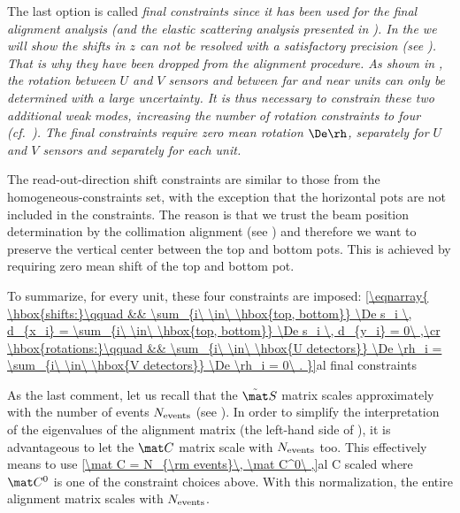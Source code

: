 \> The last option is called \em{final constraints} since it has been used for the final alignment analysis (and the elastic scattering analysis presented in ). In the  we will show the shifts in $z$ can not be resolved with a satisfactory precision (see ). That is why they have been dropped from the alignment procedure. As shown in , the rotation between $U$ and $V$ sensors and between far and near units can only be determined with a large uncertainty. It is thus necessary to constrain these two additional weak modes, increasing the number of rotation constraints to four (cf.~). The final constraints require zero mean rotation $\De\rh$, separately for $U$ and $V$ sensors and separately for each unit.
\par\parindent\itindent\indent\hang
The read-out-direction shift constraints are similar to those from the homogeneous-constraints set, with the exception that the horizontal pots are not included in the constraints. The reason is that we trust the beam position determination by the collimation alignment (see ) and therefore we want to preserve the vertical center between the top and bottom pots. This is achieved by requiring zero mean shift of the top and bottom pot.
\par\parindent\itindent\indent\hang
To summarize, for every unit, these four constraints are imposed:
\eqref{\eqnarray{
\hbox{shifts:}\qquad && \sum_{i\ \in\ \hbox{top, bottom}} \De s_i \, d_{x_i} = \sum_{i\ \in\ \hbox{top, bottom}} \De s_i \, d_{y_i} = 0\ ,\cr
\hbox{rotations:}\qquad && \sum_{i\ \in\ \hbox{U detectors}} \De \rh_i = \sum_{i\ \in\ \hbox{V detectors}} \De \rh_i = 0\ .
}}{al final constraints}

\iffalse
\eqref{
	C = \pmatrix{
		\vdots	&\vdots	&		&		& \cr
		d_{ix}	&d_{iy}	&		&		& \cr
		\vdots	&\vdots	&		&		& \cr
				&		&\vdots	&\vdots	& \cr
				&		&d_{ix}	&d_{iy}	& \cr
				&		&\vdots	&\vdots	& \cr\ln
				&		&		&		&1		&0		& 		& 	\cr
				&		&		&		&0		&1		& 		& 	\cr
				&		&		&		&1		&0		& 		& 	\cr
				&		&		&		&0		&1		& 		& 	\cr
				&		&		&		&\vdots	&\vdots	& 		& 	\cr
				&		&		&		&		&		&1		&0		\cr
				&		&		&		&		&		&0		&1		\cr
				&		&		&		&		&		&1		&0		\cr
				&		&		&		&		&		&0		&1		\cr
				&		&		&		&		&		&\vdots	&\vdots	\cr
	}
}{al final cnst ex}
\fi

As the last comment, let us recall that the $\tilde\mat S$ matrix scales approximately with the number of events $N_{\rm events}$ (see ). In order to simplify the interpretation of the eigenvalues of the alignment matrix (the left-hand side of ), it is advantageous to let the $\mat C$ matrix scale with $N_{\rm events}$ too. This effectively means to use
\eqref{\mat C = N_{\rm events}\, \mat C^0\ ,}{al C scaled}
where $\mat C^0$ is one of the constraint choices above. With this normalization, the entire alignment matrix scales with $N_{\rm events}$.


